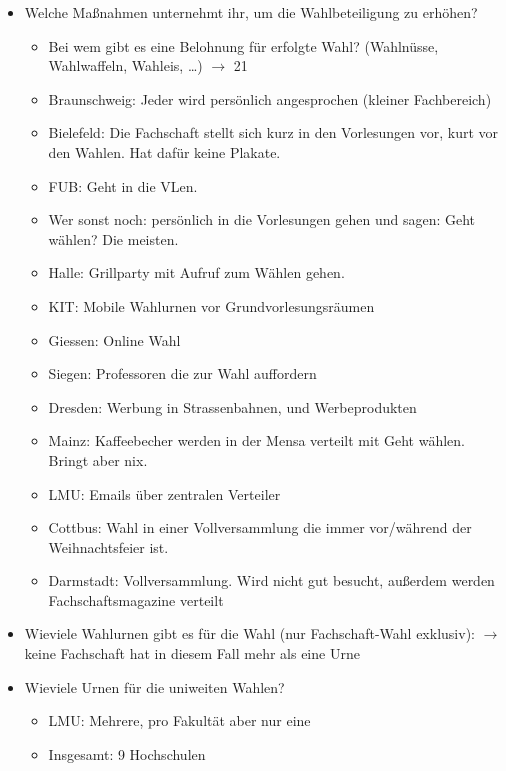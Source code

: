 \begin{itemize}
          \item Welche Maßnahmen unternehmt ihr, um die Wahlbeteiligung zu erhöhen?
            \begin{itemize}
              \item Bei wem gibt es eine Belohnung für erfolgte Wahl? (Wahlnüsse, Wahlwaffeln, Wahleis, …) $\rightarrow$ 21
              \item Braunschweig: Jeder wird persönlich angesprochen (kleiner Fachbereich)
              \item Bielefeld: Die Fachschaft stellt sich kurz in den Vorlesungen vor, kurt vor den Wahlen. Hat dafür keine Plakate.
              \item FUB: Geht in die VLen.
              \item Wer sonst noch: persönlich in die Vorlesungen gehen und sagen: \flqq Geht wählen\frqq? Die meisten.
              \item Halle: Grillparty mit Aufruf zum Wählen gehen.
              \item KIT: Mobile Wahlurnen vor Grundvorlesungsräumen
              \item Giessen: Online Wahl
              \item Siegen: Professoren die zur Wahl auffordern
              \item Dresden: Werbung in Strassenbahnen, und Werbeprodukten
              \item Mainz: Kaffeebecher werden in der Mensa verteilt mit \flqq Geht wählen\frqq. Bringt aber nix.
              \item LMU: Emails über zentralen Verteiler
              \item Cottbus: Wahl in einer Vollversammlung die immer vor/während der Weihnachtsfeier ist.
              \item Darmstadt: Vollversammlung. Wird nicht gut besucht, außerdem werden Fachschaftsmagazine verteilt
            \end{itemize}

          \item Wieviele Wahlurnen gibt es für die Wahl (nur Fachschaft-Wahl exklusiv):
            $\rightarrow$ keine Fachschaft hat in diesem Fall mehr als eine Urne

          \item Wieviele Urnen für die uniweiten Wahlen?
            \begin{itemize}
              \item LMU: Mehrere, pro Fakultät aber nur eine
              \item Insgesamt: 9 Hochschulen
            \end{itemize}


\end{itemize}
